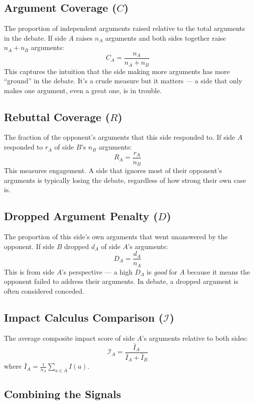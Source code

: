 \documentclass[11pt]{article}
\begin{document}
\subsection{Argument Coverage ($C$)}

The proportion of independent arguments raised relative to the total arguments in the debate. If side $A$ raises $n_A$ arguments and both sides together raise $n_A + n_B$ arguments:
\[
    C_A = \frac{n_A}{n_A + n_B}
\]
This captures the intuition that the side making more arguments has more ``ground'' in the debate. It's a crude measure but it matters --- a side that only makes one argument, even a great one, is in trouble.

\subsection{Rebuttal Coverage ($R$)}

The fraction of the opponent's arguments that this side responded to. If side $A$ responded to $r_A$ of side $B$'s $n_B$ arguments:
\[
    R_A = \frac{r_A}{n_B}
\]
This measures engagement. A side that ignores most of their opponent's arguments is typically losing the debate, regardless of how strong their own case is.

\subsection{Dropped Argument Penalty ($D$)}

The proportion of this side's own arguments that went unanswered by the opponent. If side $B$ dropped $d_A$ of side $A$'s arguments:
\[
    D_A = \frac{d_A}{n_A}
\]
This is from side $A$'s perspective --- a high $D_A$ is \textit{good} for $A$ because it means the opponent failed to address their arguments. In debate, a dropped argument is often considered conceded.

\subsection{Impact Calculus Comparison ($\mathcal{I}$)}

The average composite impact score of side $A$'s arguments relative to both sides:
\[
    \mathcal{I}_A = \frac{\bar{I}_A}{\bar{I}_A + \bar{I}_B}
\]
where $\bar{I}_A = \frac{1}{n_A}\sum_{a \in A} I(a)$.

\subsection{Combining the Signals}
\end{document}
